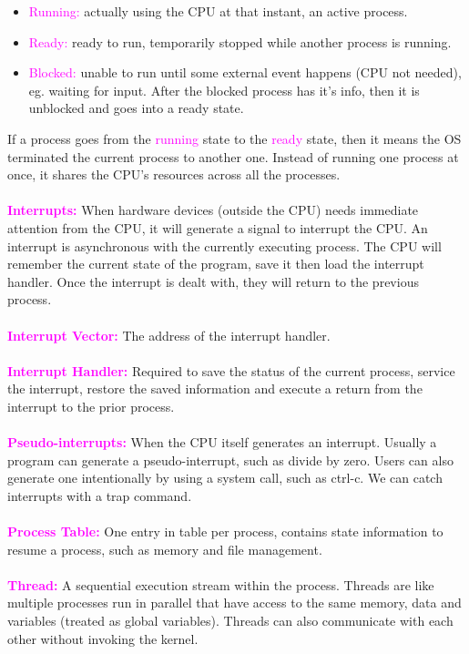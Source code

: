 \documentclass[a4paper,10pt]{article}
\begin{document}
\begin{itemize}
\item \textcolor{Magenta}{Running:} actually using the CPU at that instant, an active process.
\item \textcolor{Magenta}{Ready:} ready to run, temporarily stopped while another process is running. 
\item \textcolor{Magenta}{Blocked:} unable to run until some external event happens (CPU not needed), eg. waiting for input. After the blocked process has it's info, then it is unblocked and goes into a ready state.
\end{itemize}
If a process goes from the \textcolor{Magenta}{running} state to the \textcolor{Magenta}{ready} state, then it means the OS terminated the current process to another one. Instead of running one process at once, it shares the CPU's resources across all the processes. \\\\
\textcolor{Magenta}{\textbf{Interrupts:}} When hardware devices (outside the CPU) needs immediate attention from the CPU, it will generate a signal to interrupt the CPU. An interrupt is asynchronous with the currently executing process. The CPU will remember the current state of the program, save it then load the interrupt handler. Once the interrupt is dealt with, they will return to the previous process. \\\\
\textcolor{Magenta}{\textbf{Interrupt Vector:}} The address of the interrupt handler. \\\\
\textcolor{Magenta}{\textbf{Interrupt Handler:}} Required to save the status of the current process, service the interrupt, restore the saved information and execute a return from the interrupt to the prior process. \\\\
\textcolor{Magenta}{\textbf{Pseudo-interrupts:}} When the CPU itself generates an interrupt. Usually a program can generate a pseudo-interrupt, such as divide by zero. Users can also generate one intentionally by using a system call, such as ctrl-c. We can catch interrupts with a trap command. \\\\
\textcolor{Magenta}{\textbf{Process Table:}} One entry in table per process, contains state information to resume a process, such as memory and file management. \\\\
\textcolor{Magenta}{\textbf{Thread:}} A sequential execution stream within the process. Threads are like multiple processes run in parallel that have access to the same memory, data and variables (treated as global variables). Threads can also communicate with each other without invoking the kernel. \\\\
\end{document}

